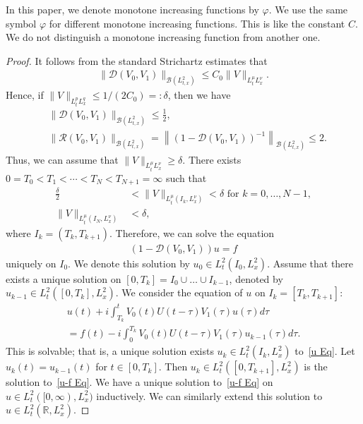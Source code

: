 \documentclass[AHL,Unicode,longabstracts,MathTools,published]{cedram}
\newcommand{\CB}{\mathcal{B}}
\newcommand{\CD}{\mathcal{D}}
\newcommand{\CR}{\mathcal{R}}
\newcommand{\de}{\delta}
\newcommand{\ph}{\varphi}
\newcommand{\ta}{\tau}
\newcommand{\I}{\infty}
\newcommand{\R}{\mathbb{R}}
\begin{document}
\begin{rema}
In this paper, we denote monotone increasing functions by $\ph$. We use the same symbol $\ph$ for different monotone increasing functions. This is like the constant $C$. We do not distinguish a monotone increasing function from another one.
\end{rema}


\begin{proof}
It follows from the standard Strichartz estimates that
\begin{align}
\| \CD(V_0,V_1) \|_{\CB\left(L^2_{t,x}\right)} \leq C_0 \|V\|_{L^\mu_tL^\nu_x}.
\end{align}
Hence, if $\|V\|_{L^p_tL^q_x} \leq 1/(2C_0) =: \de$, then we have
\begin{align}
&\| \CD(V_0,V_1) \|_{\CB\left(L^2_{t,x}\right)} \leq \frac{1}{2}, \\
&\|\CR(V_0,V_1)\|_{\CB\left(L^2_{t,x}\right)} = \left\|(1-\CD(V_0,V_1))^{-1}\right\|_{\CB\left(L^2_{t,x}\right)} \leq 2.
\end{align}
Thus, we can assume that $\|V\|_{L^\mu_t L^\nu_x} \geq \de$. There exists $0=T_0 <T_1 < \cdots < T_N<T_{N+1}=\I$ such that
\begin{align}\label{V condi}
\frac{\de}{2} &< \|V\|_{L^\mu_t\left(I_k, L^\nu_x\right)} < \de \text{ for } k = 0,\dots,N-1, \\
\|V\|_{L^\mu_t\left(I_N, L^\nu_x\right)} &< \de,
\end{align}
where $I_k = (T_k, T_{k+1})$. Therefore, we can solve the equation
\begin{align}\label{u-f Eq}
(1-\CD(V_0,V_1))u = f
\end{align}
uniquely on $I_0$. We denote this solution by $u_0 \in L^2_t(I_0,L^2_x)$. Assume that there exists a unique solution on $[0,T_k] = I_0\cup \dots \cup I_{k-1}$, denoted by $u_{k-1} \in L^2_t([0,T_k],L^2_x)$. We consider the equation of $u$ on $I_k = [T_k,T_{k+1}]$:
\begin{multline}\label{u Eq}
u(t) +i\int_{T_k}^t V_0(t)U(t-\ta)V_1(\ta)u(\ta)d\ta \\
= f(t) - i\int_0^{T_k} V_0(t)U(t-\ta)V_1(\ta)u_{k-1}(\ta) d\ta.
\end{multline}
This is solvable; that is, a unique solution exists $u_k \in L^2_t(I_k,L^2_x)$ to~\eqref{u Eq}. Let $u_k(t)=u_{k-1}(t)$ for $t \in [0,T_k]$. Then $u_k \in L^2_t([0,T_{k+1}], L^2_x)$ is the solution to~\eqref{u-f Eq}. We have a unique solution to~\eqref{u-f Eq} on $u \in L^2_t([0,\I),L^2_x)$ inductively. We can similarly extend this solution to $u\in L^2_t(\R, L^2_x)$.


\end{proof}
\end{document}

